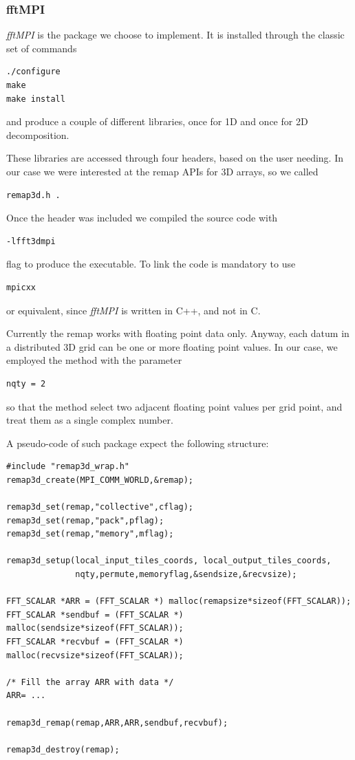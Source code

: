 \subsubsection{fftMPI}
\emph{fftMPI} is the package we choose to implement. It is installed through the classic set of commands 
\begin{lstlisting}
./configure 
make 
make install
\end{lstlisting}
and produce a couple of different libraries, once for 1D and once for 2D decomposition.
\par
These libraries are accessed through four headers, based on the user needing. In our case we were interested at the remap APIs for 3D arrays, so we called 
\begin{lstlisting} 
remap3d.h .
\end{lstlisting}
Once the header was included we compiled the source code with 
\begin{lstlisting}
-lfft3dmpi
\end{lstlisting}
flag to produce the executable. To link the code is mandatory to use 
\begin{lstlisting}
mpicxx
\end{lstlisting}
or equivalent, since \emph{fftMPI} is written in C++, and not in C. \\
\par
Currently the remap works with floating point data only. Anyway, each datum in a distributed 3D grid can be one or more floating point values. In our case, we employed the method with the parameter
\begin{lstlisting}
nqty = 2
\end{lstlisting}
so that the method select two adjacent floating point values per grid point, and treat them as a single complex number. \\
\par
A pseudo-code of such package expect the following structure:
\begin{lstlisting}
#include "remap3d_wrap.h" 
remap3d_create(MPI_COMM_WORLD,&remap);

remap3d_set(remap,"collective",cflag);
remap3d_set(remap,"pack",pflag);
remap3d_set(remap,"memory",mflag); 

remap3d_setup(local_input_tiles_coords, local_output_tiles_coords,
              nqty,permute,memoryflag,&sendsize,&recvsize); 
              
FFT_SCALAR *ARR = (FFT_SCALAR *) malloc(remapsize*sizeof(FFT_SCALAR));
FFT_SCALAR *sendbuf = (FFT_SCALAR *) malloc(sendsize*sizeof(FFT_SCALAR));
FFT_SCALAR *recvbuf = (FFT_SCALAR *) malloc(recvsize*sizeof(FFT_SCALAR)); 

/* Fill the array ARR with data */
ARR= ...

remap3d_remap(remap,ARR,ARR,sendbuf,recvbuf); 

remap3d_destroy(remap); 
\end{lstlisting}
